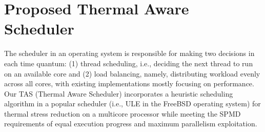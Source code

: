 \documentclass[times, 10pt,twocolumn]{IEEEtran}
\begin{document}
\section{Proposed Thermal Aware Scheduler}
\label{sec:sdesign} 
The scheduler in an operating system is responsible for making two
decisions in each time quantum: (1) thread scheduling, i.e., deciding
the next thread to run on an available core and (2) load balancing,
namely, distributing workload evenly across all cores, with existing
implementations mostly focusing on performance.  Our TAS (Thermal Aware
Scheduler) incorporates a heuristic scheduling algorithm in a popular
scheduler (i.e., ULE in the FreeBSD operating system) for thermal stress
reduction on a multicore processor while meeting the SPMD requirements
of equal execution progress and maximum parallelism exploitation.
\end{document}
